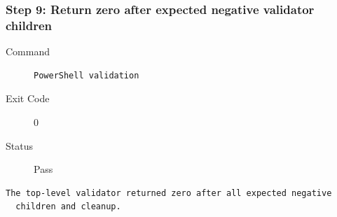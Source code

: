 \subsubsection*{Step 9: Return zero after expected negative validator children}
\begin{description}
\item[Command] \mbox{}
\begin{verbatim}
PowerShell validation
\end{verbatim}
\item[Exit Code] 0
\item[Status] Pass
\end{description}
\begin{verbatim}
The top-level validator returned zero after all expected negative
  children and cleanup.
\end{verbatim}
